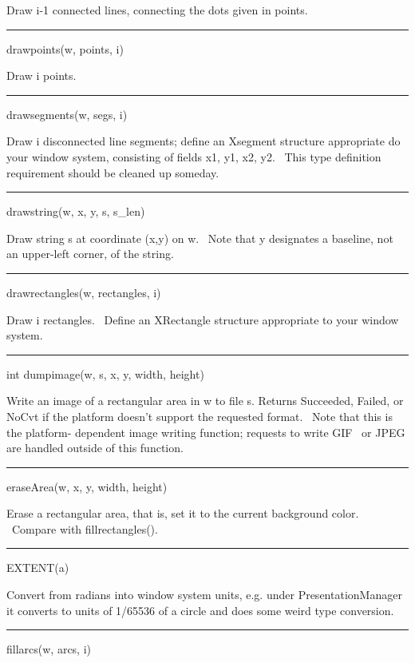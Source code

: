 Draw i-1 connected lines, connecting the dots given in points.


\bigskip\hrule\vspace{0.1cm}
\noindent
drawpoints(w, points, i)


Draw i points.


\bigskip\hrule\vspace{0.1cm}
\noindent
drawsegments(w, segs, i)


Draw i disconnected line segments; define an Xsegment structure appropriate do your window system, consisting of fields
x1, y1, x2, y2. \ This type definition requirement should be cleaned up someday.


\bigskip\hrule\vspace{0.1cm}
\noindent
drawstring(w, x, y, s, s\_len)


Draw string s at coordinate (x,y) on w. \ Note that y designates a baseline, not an upper-left corner, of the string.


\bigskip\hrule\vspace{0.1cm}
\noindent
drawrectangles(w, rectangles, i)


Draw \textsf{i} rectangles. \ Define an XRectangle structure appropriate to your window system.

\bigskip\hrule\vspace{0.1cm}
\noindent



int dumpimage(w, s, x, y, width, height)


Write an image of a rectangular area in w to file s. Returns \textsf{Succeeded}, \textsf{Failed}, or \textsf{NoCvt} if
the platform doesn't support the requested format. \ Note that this is the {\textquotedbl}platform- dependent image
writing function{\textquotedbl}; requests to write GIF \ or JPEG are handled outside of this function.


\bigskip\hrule\vspace{0.1cm}
\noindent
eraseArea(w, x, y, width, height)


Erase a rectangular area, that is, set it to the current background color. \ Compare with \textsf{fillrectangles()}.


\bigskip\hrule\vspace{0.1cm}
\noindent
EXTENT(a)


Convert from radians into window system units, e.g. under PresentationManager it converts to units of 1/65536 of a
circle and does some weird type conversion.


\bigskip\hrule\vspace{0.1cm}
\noindent
fillarcs(w, arcs, i)



